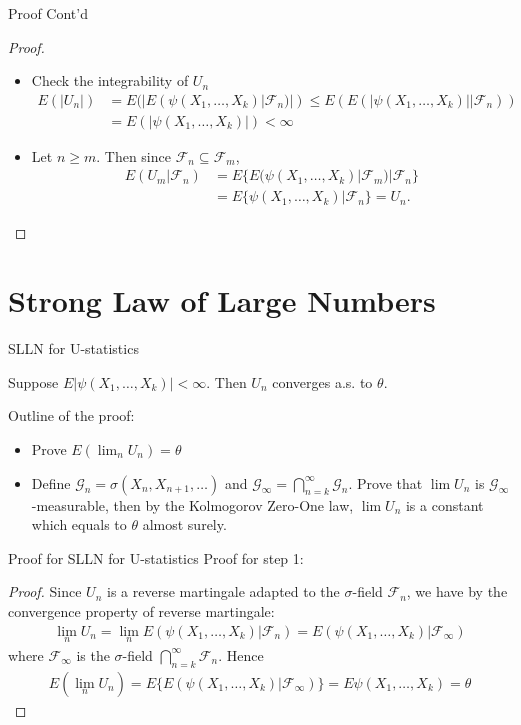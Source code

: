 \documentclass{beamer}
\theoremstyle{definition}
\numberwithin{Def}{section}
\begin{document}
\begin{frame}{Proof Cont'd}
\begin{fontsize}{9}{12}
\begin{proof}
\begin{itemize}
    \item Check the integrability of $U_n$
\begin{align*}
E(|U_n|)&=E(|E(\psi(X_1,\dotsc,X_k)|\mathcal{F}_n)|)\le E(E(|\psi(X_1,\dotsc,X_k)||\mathcal{F}_n))\\
&=E(|\psi(X_1,\dotsc, X_k)|)<\infty
\end{align*}
    \item Let $n\ge m$. Then since $\mathcal{F}_n \subseteq \mathcal{F}_m$,
    \begin{align*}
    E(U_m|\mathcal{F}_n)&=E\{E(\psi(X_1,\dotsc,X_k)|\mathcal{F}_m)|\mathcal{F}_n\}\\
    &=E\{\psi(X_1,\dotsc,X_k)|\mathcal{F}_n\}
    =U_n.
\end{align*}
\end{itemize}
\end{proof}
\end{fontsize}
\end{frame}

\section{Strong Law of Large Numbers}
\begin{frame}{SLLN for U-statistics}
\begin{theorem}
Suppose $E|\psi(X_1, \dotsc,X_k)|<\infty$. Then $U_n$ converges a.s. to $\theta$.
\end{theorem}
Outline of the proof:
\begin{itemize}
    \item Prove $E(\lim_n U_n)=\theta$
    \item Define $\mathcal{G}_n=\sigma(X_n,X_{n+1},\dotsc)$ and $\mathcal{G}_\infty=\bigcap_{n=k}^\infty\mathcal{G}_n$. Prove that $\lim U_n$ is $\mathcal{G}_\infty$-measurable, then by the Kolmogorov Zero-One law, $\lim U_n$ is a constant which equals to $\theta$ almost surely.
\end{itemize}
\end{frame}

\begin{frame}{Proof for SLLN for U-statistics}
Proof for step 1:
\begin{proof}
Since $U_n$ is a reverse martingale adapted to the $\sigma$-field $\mathcal{F}_n$, we have by the convergence property of reverse martingale:
\begin{align*}
\lim_n U_n = \lim_n E(\psi(X_1,\dotsc,X_k)|\mathcal{F}_n)=E(\psi(X_1,\dotsc,X_k)|\mathcal{F}_\infty)    
\end{align*}
where $\mathcal{F}_\infty$ is the $\sigma$-field $\bigcap_{n=k}^\infty \mathcal{F}_n$. Hence
\begin{align*}
E(\lim_n U_n)=E\{E(\psi(X_1,\dotsc,X_k)|\mathcal{F}_\infty)\}=E\psi(X_1, \dotsc,X_k)=\theta
\end{align*}
\end{proof}
\end{frame}
\end{document}
